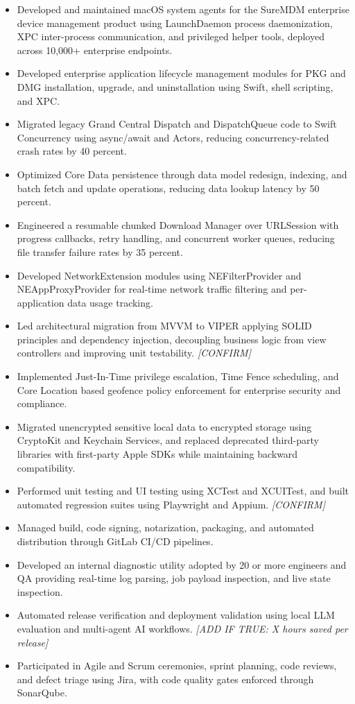 \documentclass[letterpaper,11pt]{article}
\begin{document}
\begin{itemize}
  \item Developed and maintained macOS system agents for the SureMDM enterprise device
        management product using LaunchDaemon process daemonization, XPC inter-process
        communication, and privileged helper tools, deployed across 10,000+ enterprise endpoints.
  \item Developed enterprise application lifecycle management modules for PKG and DMG
        installation, upgrade, and uninstallation using Swift, shell scripting, and XPC.
  \item Migrated legacy Grand Central Dispatch and DispatchQueue code to Swift Concurrency
        using async/await and Actors, reducing concurrency-related crash rates by 40 percent.
  \item Optimized Core Data persistence through data model redesign, indexing, and batch fetch
        and update operations, reducing data lookup latency by 50 percent.
  \item Engineered a resumable chunked Download Manager over URLSession with progress
        callbacks, retry handling, and concurrent worker queues, reducing file transfer failure
        rates by 35 percent.
  \item Developed NetworkExtension modules using NEFilterProvider and NEAppProxyProvider for
        real-time network traffic filtering and per-application data usage tracking.
  \item Led architectural migration from MVVM to VIPER applying SOLID principles and dependency
        injection, decoupling business logic from view controllers and improving unit
        testability. \textit{[CONFIRM]}
  \item Implemented Just-In-Time privilege escalation, Time Fence scheduling, and Core Location
        based geofence policy enforcement for enterprise security and compliance.
  \item Migrated unencrypted sensitive local data to encrypted storage using CryptoKit and
        Keychain Services, and replaced deprecated third-party libraries with first-party Apple
        SDKs while maintaining backward compatibility.
  \item Performed unit testing and UI testing using XCTest and XCUITest, and built automated
        regression suites using Playwright and Appium. \textit{[CONFIRM]}
  \item Managed build, code signing, notarization, packaging, and automated distribution through
        GitLab CI/CD pipelines.
  \item Developed an internal diagnostic utility adopted by 20 or more engineers and QA
        providing real-time log parsing, job payload inspection, and live state inspection.
  \item Automated release verification and deployment validation using local LLM evaluation and
        multi-agent AI workflows. \textit{[ADD IF TRUE: X hours saved per release]}
  \item Participated in Agile and Scrum ceremonies, sprint planning, code reviews, and defect
        triage using Jira, with code quality gates enforced through SonarQube.
\end{itemize}
\end{document}
